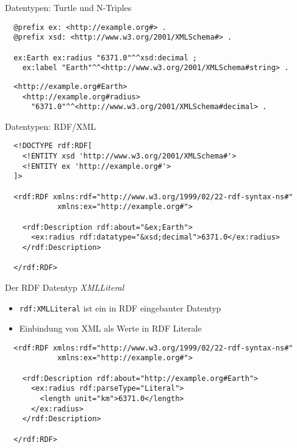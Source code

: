 \documentclass{beamer}
\begin{document}
\begin{frame}[fragile]{Datentypen: Turtle und N-Triples}
	
	\small
	\begin{lstlisting}
  @prefix ex: <http://example.org#> .
  @prefix xsd: <http://www.w3.org/2001/XMLSchema#> . 
		
  ex:Earth ex:radius "6371.0"^^xsd:decimal ;
    ex:label "Earth"^^<http://www.w3.org/2001/XMLSchema#string> .
		\end{lstlisting}
	
	\vspace{1.5cm}
	
	\small
	\begin{lstlisting}
  <http://example.org#Earth> 
    <http://example.org#radius> 
      "6371.0"^^<http://www.w3.org/2001/XMLSchema#decimal> .
	\end{lstlisting}
	
\end{frame}

\begin{frame}[fragile]{Datentypen: RDF/XML}
	
	\small
	\begin{lstlisting}
  <!DOCTYPE rdf:RDF[
    <!ENTITY xsd 'http://www.w3.org/2001/XMLSchema#'>
    <!ENTITY ex 'http://example.org#'>
  ]>
    
  <rdf:RDF xmlns:rdf="http://www.w3.org/1999/02/22-rdf-syntax-ns#"
            xmlns:ex="http://example.org#">
	
    <rdf:Description rdf:about="&ex;Earth">
      <ex:radius rdf:datatype="&xsd;decimal">6371.0</ex:radius>
    </rdf:Description>
	
  </rdf:RDF>		
	\end{lstlisting}
	
\end{frame}

\begin{frame}[fragile]{Der RDF Datentyp \emph{XMLLiteral}}
	
	\begin{itemize}
		\item \texttt{rdf:XMLLiteral} ist ein in RDF eingebauter Datentyp
		\item Einbindung von XML als Werte in RDF Literale
	\end{itemize}
	
	\small
	\begin{lstlisting}		
  <rdf:RDF xmlns:rdf="http://www.w3.org/1999/02/22-rdf-syntax-ns#"
            xmlns:ex="http://example.org#">
		
    <rdf:Description rdf:about="http://example.org#Earth">
      <ex:radius rdf:parseType="Literal">
        <length unit="km">6371.0</length>
      </ex:radius>
    </rdf:Description>
		
  </rdf:RDF>		
	\end{lstlisting}
	
\end{frame}
\end{document}

